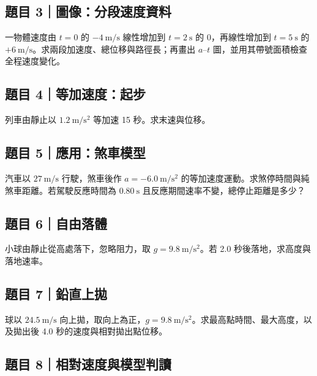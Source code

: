 \documentclass[11pt,a4paper]{article}
\begin{document}
\subsection{題目 3｜圖像：分段速度資料}\label{ux984cux76ee-3ux5716ux50cfux5206ux6bb5ux901fux5ea6ux8cc7ux6599}

一物體速度由 \(t=0\) 的 \(-4\ \mathrm{m/s}\) 線性增加到 \(t=2\ \mathrm{s}\) 的 0，再線性增加到 \(t=5\ \mathrm{s}\) 的 \(+6\ \mathrm{m/s}\)。求兩段加速度、總位移與路徑長；再畫出 \(a\text{–}t\) 圖，並用其帶號面積檢查全程速度變化。

\subsection{題目 4｜等加速度：起步}\label{ux984cux76ee-4ux7b49ux52a0ux901fux5ea6ux8d77ux6b65}

列車由靜止以 \(1.2\ \mathrm{m/s^2}\) 等加速 15 秒。求末速與位移。

\subsection{題目 5｜應用：煞車模型}\label{ux984cux76ee-5ux61c9ux7528ux715eux8ecaux6a21ux578b}

汽車以 \(27\ \mathrm{m/s}\) 行駛，煞車後作 \(a=-6.0\ \mathrm{m/s^2}\) 的等加速度運動。求煞停時間與純煞車距離。若駕駛反應時間為 \(0.80\ \mathrm{s}\) 且反應期間速率不變，總停止距離是多少？

\subsection{題目 6｜自由落體}\label{ux984cux76ee-6ux81eaux7531ux843dux9ad4}

小球由靜止從高處落下，忽略阻力，取 \(g=9.8\ \mathrm{m/s^2}\)。若 2.0 秒後落地，求高度與落地速率。

\subsection{題目 7｜鉛直上拋}\label{ux984cux76ee-7ux925bux76f4ux4e0aux62cb}

球以 \(24.5\ \mathrm{m/s}\) 向上拋，取向上為正，\(g=9.8\ \mathrm{m/s^2}\)。求最高點時間、最大高度，以及拋出後 4.0 秒的速度與相對拋出點位移。

\subsection{題目 8｜相對速度與模型判讀}\label{ux984cux76ee-8ux76f8ux5c0dux901fux5ea6ux8207ux6a21ux578bux5224ux8b80}
\end{document}
